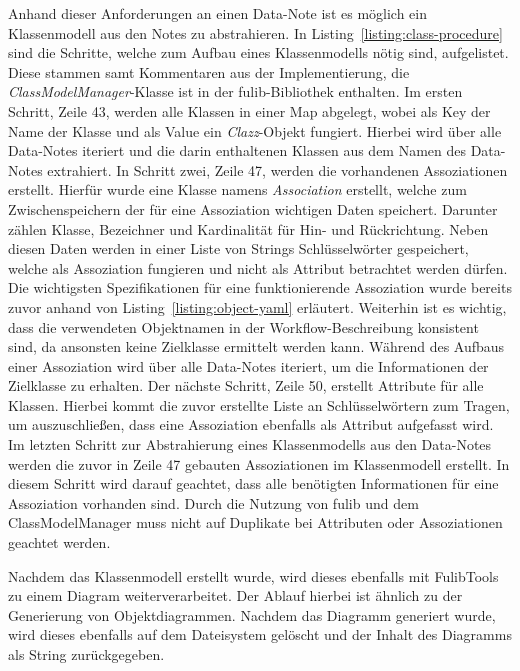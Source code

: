 Anhand dieser Anforderungen an einen Data-Note ist es möglich ein Klassenmodell aus den Notes zu abstrahieren.
In Listing~\ref{listing:class-procedure} sind die Schritte, welche zum Aufbau eines Klassenmodells nötig sind, aufgelistet.
Diese stammen samt Kommentaren aus der Implementierung, die \textit{ClassModelManager}-Klasse ist in der fulib-Bibliothek enthalten.
Im ersten Schritt, Zeile 43, werden alle Klassen in einer Map abgelegt, wobei als Key der Name der Klasse und als Value ein \textit{Clazz}-Objekt fungiert.
Hierbei wird über alle Data-Notes iteriert und die darin enthaltenen Klassen aus dem Namen des Data-Notes extrahiert.
In Schritt zwei, Zeile 47, werden die vorhandenen Assoziationen erstellt.
Hierfür wurde eine Klasse namens \textit{Association} erstellt, welche zum Zwischenspeichern der für eine Assoziation wichtigen Daten speichert.
Darunter zählen Klasse, Bezeichner und Kardinalität für Hin- und Rückrichtung.
Neben diesen Daten werden in einer Liste von Strings Schlüsselwörter gespeichert, welche als Assoziation fungieren und nicht als Attribut betrachtet werden dürfen.
Die wichtigsten Spezifikationen für eine funktionierende Assoziation wurde bereits zuvor anhand von Listing~\ref{listing:object-yaml} erläutert.
Weiterhin ist es wichtig, dass die verwendeten Objektnamen in der Workflow-Beschreibung konsistent sind, da ansonsten keine Zielklasse ermittelt werden kann.
Während des Aufbaus einer Assoziation wird über alle Data-Notes iteriert, um die Informationen der Zielklasse zu erhalten.
Der nächste Schritt, Zeile 50, erstellt Attribute für alle Klassen.
Hierbei kommt die zuvor erstellte Liste an Schlüsselwörtern zum Tragen, um auszuschließen, dass eine Assoziation ebenfalls als Attribut aufgefasst wird.
Im letzten Schritt zur Abstrahierung eines Klassenmodells aus den Data-Notes werden die zuvor in Zeile 47 gebauten Assoziationen im Klassenmodell erstellt.
In diesem Schritt wird darauf geachtet, dass alle benötigten Informationen für eine Assoziation vorhanden sind.
Durch die Nutzung von fulib und dem ClassModelManager muss nicht auf Duplikate bei Attributen oder Assoziationen geachtet werden.

Nachdem das Klassenmodell erstellt wurde, wird dieses ebenfalls mit FulibTools zu einem Diagram weiterverarbeitet.
Der Ablauf hierbei ist ähnlich zu der Generierung von Objektdiagrammen.
Nachdem das Diagramm generiert wurde, wird dieses ebenfalls auf dem Dateisystem gelöscht und der Inhalt des Diagramms als String zurückgegeben.

